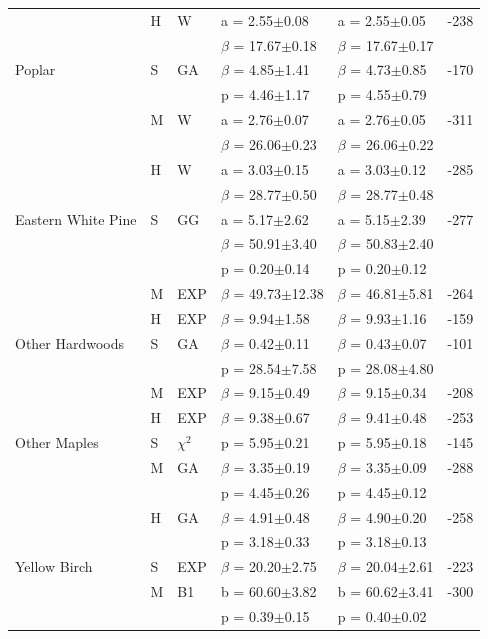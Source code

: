 \message{ !name(pspdistfit_article.tex)}\documentclass{article}
\begin{document}
\begin{table}
{\begin{tabular}{lllllr}
 & H & W & a = 2.55$\pm$0.08 & a = 2.55$\pm$0.05 & -238 \\
 &  &  & $\beta$ = 17.67$\pm$0.18 & $\beta$ = 17.67$\pm$0.17 &  \\
Poplar & S & GA & $\beta$ = 4.85$\pm$1.41 & $\beta$ = 4.73$\pm$0.85 & -170 \\
 &  &  & p = 4.46$\pm$1.17 & p = 4.55$\pm$0.79 &  \\
 & M & W & a = 2.76$\pm$0.07 & a = 2.76$\pm$0.05 & -311 \\
 &  &  & $\beta$ = 26.06$\pm$0.23 & $\beta$ = 26.06$\pm$0.22 &  \\
 & H & W & a = 3.03$\pm$0.15 & a = 3.03$\pm$0.12 & -285 \\
 &  &  & $\beta$ = 28.77$\pm$0.50 & $\beta$ = 28.77$\pm$0.48 &  \\
Eastern White Pine & S & GG & a = 5.17$\pm$2.62 & a = 5.15$\pm$2.39 & -277 \\
 &  &  & $\beta$ = 50.91$\pm$3.40 & $\beta$ = 50.83$\pm$2.40 &  \\
 &  &  & p = 0.20$\pm$0.14 & p = 0.20$\pm$0.12 &  \\
 & M & EXP & $\beta$ = 49.73$\pm$12.38 & $\beta$ = 46.81$\pm$5.81 & -264 \\
 & H & EXP & $\beta$ = 9.94$\pm$1.58 & $\beta$ = 9.93$\pm$1.16 & -159 \\
Other Hardwoods & S & GA & $\beta$ = 0.42$\pm$0.11 & $\beta$ = 0.43$\pm$0.07 & -101 \\
 &  &  & p = 28.54$\pm$7.58 & p = 28.08$\pm$4.80 &  \\
 & M & EXP & $\beta$ = 9.15$\pm$0.49 & $\beta$ = 9.15$\pm$0.34 & -208 \\
 & H & EXP & $\beta$ = 9.38$\pm$0.67 & $\beta$ = 9.41$\pm$0.48 & -253 \\
Other Maples & S & $\chi^2$ & p = 5.95$\pm$0.21 & p = 5.95$\pm$0.18 & -145 \\
 & M & GA & $\beta$ = 3.35$\pm$0.19 & $\beta$ = 3.35$\pm$0.09 & -288 \\
 &  &  & p = 4.45$\pm$0.26 & p = 4.45$\pm$0.12 &  \\
 & H & GA & $\beta$ = 4.91$\pm$0.48 & $\beta$ = 4.90$\pm$0.20 & -258 \\
 &  &  & p = 3.18$\pm$0.33 & p = 3.18$\pm$0.13 &  \\
Yellow Birch & S & EXP & $\beta$ = 20.20$\pm$2.75 & $\beta$ = 20.04$\pm$2.61 & -223 \\
 & M & B1 & b = 60.60$\pm$3.82 & b = 60.62$\pm$3.41 & -300 \\
 &  &  & p = 0.39$\pm$0.15 & p = 0.40$\pm$0.02 &  \\

\end{tabular}}
\end{table}
\end{document}
